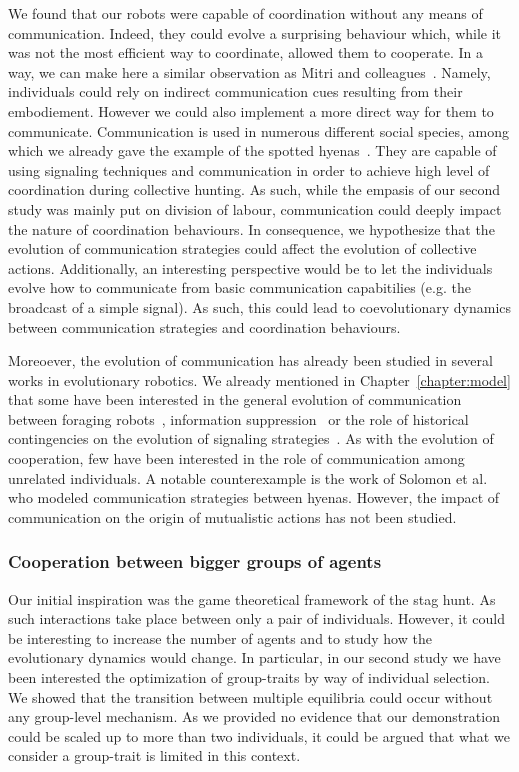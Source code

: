 			We found that our robots were capable of coordination without any means of communication. Indeed, they could evolve a surprising behaviour which, while it was not the most efficient way to coordinate, allowed them to cooperate. In a way, we can make here a similar observation as Mitri and colleagues~\parencite{Mitri2009}. Namely, individuals could rely on indirect communication cues resulting from their embodiement. However we could also implement a more direct way for them to communicate. Communication is used in numerous different social species, among which we already gave the example of the spotted hyenas~\parencite{Drea2009a, Smith2010, Smith2012a}. They are capable of using signaling techniques and communication in order to achieve high level of coordination during collective hunting. As such, while the empasis of our second study was mainly put on division of labour, communication could deeply impact the nature of coordination behaviours. In consequence, we hypothesize that the evolution of communication strategies could affect the evolution of collective actions. Additionally, an interesting perspective would be to let the individuals evolve how to communicate from basic communication capabitilies (e.g. the broadcast of a simple signal). As such, this could lead to coevolutionary dynamics between communication strategies and coordination behaviours.

			Moreoever, the evolution of communication has already been studied in several works in evolutionary robotics. We already mentioned in Chapter~\ref{chapter:model} that some have been interested in the general evolution of communication between foraging robots~\parencite{Floreano2007}, information suppression~\parencite{Mitri2009} or the role of historical contingencies on the evolution of signaling strategies~\parencite{Wischmann2012}. As with the evolution of cooperation, few have been interested in the role of communication among unrelated individuals. A notable counterexample is the work of Solomon et al.~\parencite{Solomon2012} who modeled communication strategies between hyenas. However, the impact of communication on the origin of mutualistic actions has not been studied.


		\subsubsection{Cooperation between bigger groups of agents}

			Our initial inspiration was the game theoretical framework of the stag hunt. As such interactions take place between only a pair of individuals. However, it could be interesting to increase the number of agents and to study how the evolutionary dynamics would change. In particular, in our second study we have been interested the optimization of group-traits by way of individual selection. We showed that the transition between multiple equilibria could occur without any group-level mechanism. As we provided no evidence that our demonstration could be scaled up to more than two individuals, it could be argued that what we consider a group-trait is limited in this context. 

